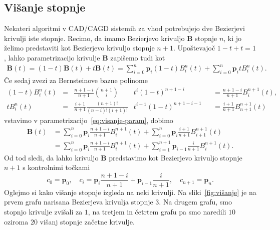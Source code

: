 \documentclass[isrm2, tisk]{fmfdelo}
\newcommand{\p}{\mathbf{p}}
\newcommand{\B}{\mathbf{B}}
\begin{document}
    \subsection{Višanje stopnje}
    Nekateri algoritmi v CAD/CAGD sistemih za vhod potrebujejo dve Bezierjevi krivulji iste stopnje.
    Recimo, da imamo Bezierjevo krivuljo $\B$ stopnje $n$, ki jo želimo predstaviti kot Bezierjevo krivuljo stopnje $n+1$.
    Upoštevajoč $1-t+t=1$, lahko parametrizacijo krivulje $\B$ zapišemo tudi kot
    \begin{align}
        \B(t) = (1-t)\B(t)+t\B(t) = \sum_{i=0}^{n}\mathbf{p}_{i}(1-t)B_i^n(t) +\sum_{i=0}^{n}\mathbf{p}_{i}tB_i^n(t). \label{eq:visanje-param}
    \end{align}
    Če sedaj zvezi za Bernsteinove bazne polinome
    \begin{align*}
    (1-t)
        B_i^n(t) &= & \frac{n+1-i}{n+1} \binom{n+1}{i}&t^i(1-t)^{n+1-i} & &=\frac{n+1-i}{n+1}B_{i}^{n+1}(t), \\
        tB_i^n(t) &= & \frac{i+1}{n+1}\frac{(n+1)!}{(n-i)!(i+1)!}&t^{i+1}(1-t)^{n+1-i-1} & &= \frac{i+1}{n+1}B_{n+1}^{n+1}(t)
    \end{align*}
    vstavimo v parametrizacijo~\ref{eq:visanje-param}, dobimo
    \begin{align*}
        \B(t) &= \sum_{i=0}^{n}\mathbf{p}_{i}\frac{n+1-i}{n+1}B_{i}^{n+1}(t) +\sum_{i=0}^{n}\mathbf{p}_{i}\frac{i+1}{n+1}B_{i+1}^{n+1}(t)\\
        &= \sum_{i=0}^{n}\mathbf{p}_{i}\frac{n+1-i}{n+1}B_{i}^{n+1}(t) +\sum_{i=1}^{n+1}\mathbf{p}_{i-1}\frac{i}{n+1}B_{i}^{n+1}(t).
    \end{align*}
    Od tod sledi, da lahko krivuljo $\B$ predstavimo kot Bezierjevo krivuljo stopnje $n+1$ s kontrolnimi točkami \[c_0=\p_0, \quad c_i=\mathbf{p}_{i}\frac{n+1-i}{n+1} + \mathbf{p}_{i-1}\frac{i}{n+1},\quad c_{n+1}=\p_n. \]
    Oglejmo si kako višanje stopnje izgleda na neki krivulji.
    Na sliki~\ref{fig:višanje} je na prvem grafu narisana Bezierjeva krivulja stopnje $3$.
    Na drugem grafu, smo stopnjo krivulje zvišali za $1$, na tretjem in četrtem grafu pa smo naredili $10$ oziroma $20$ višanj stopnje začetne krivulje.
\end{document}
